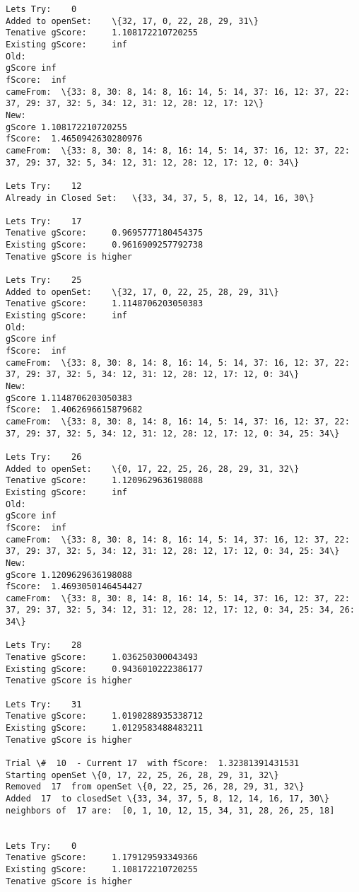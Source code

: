 \documentclass[11pt]{article}
\begin{document}
\begin{Verbatim}[commandchars=\\\{\}]
Lets Try:	 0
Added to openSet:	 \{32, 17, 0, 22, 28, 29, 31\}
Tenative gScore:	 1.108172210720255
Existing gScore:	 inf
Old:
gScore inf
fScore:  inf
cameFrom:  \{33: 8, 30: 8, 14: 8, 16: 14, 5: 14, 37: 16, 12: 37, 22: 37, 29: 37, 32: 5, 34: 12, 31: 12, 28: 12, 17: 12\}
New:
gScore 1.108172210720255
fScore:  1.4650942630280976
cameFrom:  \{33: 8, 30: 8, 14: 8, 16: 14, 5: 14, 37: 16, 12: 37, 22: 37, 29: 37, 32: 5, 34: 12, 31: 12, 28: 12, 17: 12, 0: 34\}

Lets Try:	 12
Already in Closed Set:	 \{33, 34, 37, 5, 8, 12, 14, 16, 30\}

Lets Try:	 17
Tenative gScore:	 0.9695777180454375
Existing gScore:	 0.9616909257792738
Tenative gScore is higher

Lets Try:	 25
Added to openSet:	 \{32, 17, 0, 22, 25, 28, 29, 31\}
Tenative gScore:	 1.1148706203050383
Existing gScore:	 inf
Old:
gScore inf
fScore:  inf
cameFrom:  \{33: 8, 30: 8, 14: 8, 16: 14, 5: 14, 37: 16, 12: 37, 22: 37, 29: 37, 32: 5, 34: 12, 31: 12, 28: 12, 17: 12, 0: 34\}
New:
gScore 1.1148706203050383
fScore:  1.4062696615879682
cameFrom:  \{33: 8, 30: 8, 14: 8, 16: 14, 5: 14, 37: 16, 12: 37, 22: 37, 29: 37, 32: 5, 34: 12, 31: 12, 28: 12, 17: 12, 0: 34, 25: 34\}

Lets Try:	 26
Added to openSet:	 \{0, 17, 22, 25, 26, 28, 29, 31, 32\}
Tenative gScore:	 1.1209629636198088
Existing gScore:	 inf
Old:
gScore inf
fScore:  inf
cameFrom:  \{33: 8, 30: 8, 14: 8, 16: 14, 5: 14, 37: 16, 12: 37, 22: 37, 29: 37, 32: 5, 34: 12, 31: 12, 28: 12, 17: 12, 0: 34, 25: 34\}
New:
gScore 1.1209629636198088
fScore:  1.4693050146454427
cameFrom:  \{33: 8, 30: 8, 14: 8, 16: 14, 5: 14, 37: 16, 12: 37, 22: 37, 29: 37, 32: 5, 34: 12, 31: 12, 28: 12, 17: 12, 0: 34, 25: 34, 26: 34\}

Lets Try:	 28
Tenative gScore:	 1.036250300043493
Existing gScore:	 0.9436010222386177
Tenative gScore is higher

Lets Try:	 31
Tenative gScore:	 1.0190288935338712
Existing gScore:	 1.0129583488483211
Tenative gScore is higher

Trial \#  10  - Current 17  with fScore:  1.32381391431531
Starting openSet \{0, 17, 22, 25, 26, 28, 29, 31, 32\}
Removed  17  from openSet \{0, 22, 25, 26, 28, 29, 31, 32\}
Added  17  to closedSet \{33, 34, 37, 5, 8, 12, 14, 16, 17, 30\}
neighbors of  17 are:  [0, 1, 10, 12, 15, 34, 31, 28, 26, 25, 18] 


Lets Try:	 0
Tenative gScore:	 1.179129593349366
Existing gScore:	 1.108172210720255
Tenative gScore is higher


\end{Verbatim}
\end{document}
